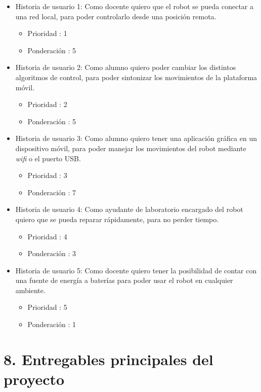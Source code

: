 \documentclass[
11pt, %
codirector, %
]{charter}
\begin{document}
\begin{itemize}
\item Historia de usuario 1: Como docente quiero que el robot se pueda conectar a una red local, para poder controlarlo desde una posición remota.
	\begin{itemize}
	\item Prioridad : 1
	\item Ponderación : 5
	\end{itemize}
\item Historia de usuario 2: Como alumno quiero poder cambiar los distintos algoritmos de control, para poder sintonizar los movimientos de la plataforma móvil. 
	\begin{itemize}
	\item Prioridad : 2
	\item Ponderación : 5
	\end{itemize}	
\item Historia de usuario 3:  Como alumno quiero tener una aplicación  gráfica en un dispositivo móvil, para poder manejar los movimientos del robot mediante \textit{wifi} o el puerto USB. 
	\begin{itemize}
	\item Prioridad : 3
	\item Ponderación : 7
	\end{itemize}
\item Historia de usuario 4: Como ayudante de laboratorio encargado del robot quiero que se pueda reparar rápidamente, para no perder tiempo. 
	\begin{itemize}
	\item Prioridad : 4
	\item Ponderación : 3
	\end{itemize}	
\item Historia de usuario 5: Como docente quiero tener la posibilidad de contar con una fuente de energía a baterías para poder usar el robot en cualquier ambiente.
	\begin{itemize}
	\item Prioridad : 5
	\item Ponderación : 1
	\end{itemize}		
\end{itemize}

\vspace{4cm} 

\section{8. Entregables principales del proyecto}
\label{sec:entregables}
\end{document}
